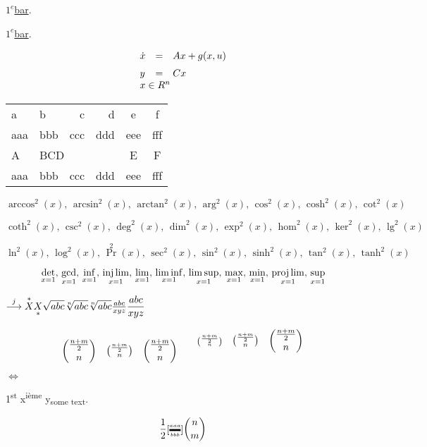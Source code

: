 \documentclass[useallsizes]{\myclass}
\begin{document}
$1^e$\underline{bar}.



$1^e$\underline{bar}.



\begin{equation}
\begin{array}{lcl}
\dot{x} & = & Ax+g(x,u)\\[2mm]
 y & = & Cx \\
 \multicolumn{3}{l}{x\in R^n} 
\end{array}
\end{equation}

\begin{tabular}{|ll|rr|cc|}
\hline a&b&c&d&e&f\\
aaa&bbb&ccc&ddd&eee&fff\\[3mm]
\hline
A&\multicolumn{3}{l}{BCD}&E&F\\
\cline{1-3}\cline{6-6}
aaa&bbb&ccc&ddd&eee&fff\\\hline
\end{tabular}
 

$$ \arccos^2 (x),\,  \arcsin^2(x) ,\,  \arctan^2(x) ,\,  \arg^2(x),\,
   \cos^2(x) ,\,   \cosh^2(x)  ,\, \cot^2(x)$$

$$ \coth^2(x) ,\,  \csc^2(x),\,   \deg^2(x),\,   \dim^2(x),\, \exp^2(x),\,
   \hom^2(x),\,   \ker^2(x) ,\,   \lg^2(x)$$

$$  \ln^2(x),\, \log^2(x),\,  \Pr^2(x),\, \sec^2(x),\, \sin^2(x) ,\,
 \sinh^2(x),\,  \tan^2(x),\, \tanh^2(x)$$

$$ \det_{x=1},\, \gcd_{x=1},\, \inf_{x=1},\, \injlim_{x=1},\,
 \lim_{x=1},\, \liminf_{x=1},\,\limsup_{x=1},\,
 \max_{x=1},\, \min_{x=1},\, \projlim_{x=1},\, \sup_{x=1}
$$

$%
\stackrel{j}{\longrightarrow} \overset{*}{X} \underset{*}{X}
\sqrt{abc} \sqrt[n]{abc} \root n \of{abc}
\frac{abc}{xyz} \dfrac{abc}{xyz}
$



$$\binom{\frac{n+m}{2}} n \quad
\tbinom{\frac{n+m}{2}} n \quad
\dbinom{\frac{n+m}{2}} n\qquad
{}^{\binom{\frac{n+m}{2}} n \quad
\tbinom{\frac{n+m}{2}} n \quad
\dbinom{\frac{n+m}{2}} n}$$



$\Leftrightarrow$


1\textsuperscript{st} x\textsuperscript{ième} y\textsubscript{some text}. 

$$\genfrac{}{}{}{}12
\genfrac[]{2pt}{2}{aaa}{bbb}
\genfrac(){0cm}{0}nm
$$
\end{document}
